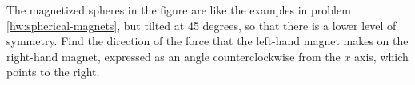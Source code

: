 The magnetized spheres in the figure are like the examples in
problem \ref{hw:spherical-magnets}, but tilted at
45 degrees, so that there is a lower level of symmetry.
Find the direction of the force that the left-hand magnet
makes on the right-hand magnet, expressed as an angle
counterclockwise from the $x$ axis, which points to the
right.\answercheck
